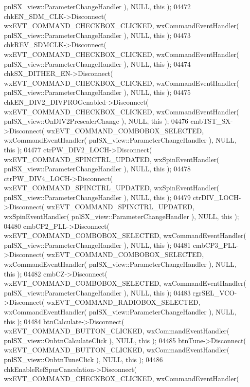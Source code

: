 \begin{DoxyCode}
      pnlSX_view::ParameterChangeHandler ), NULL, \textcolor{keyword}{this} );
04472     chkEN_SDM_CLK->Disconnect( wxEVT\_COMMAND\_CHECKBOX\_CLICKED, wxCommandEventHandler( 
      pnlSX_view::ParameterChangeHandler ), NULL, \textcolor{keyword}{this} );
04473     chkREV_SDMCLK->Disconnect( wxEVT\_COMMAND\_CHECKBOX\_CLICKED, wxCommandEventHandler( 
      pnlSX_view::ParameterChangeHandler ), NULL, \textcolor{keyword}{this} );
04474     chkSX_DITHER_EN->Disconnect( wxEVT\_COMMAND\_CHECKBOX\_CLICKED, wxCommandEventHandler( 
      pnlSX_view::ParameterChangeHandler ), NULL, \textcolor{keyword}{this} );
04475     chkEN_DIV2_DIVPROGenabled->Disconnect( wxEVT\_COMMAND\_CHECKBOX\_CLICKED, wxCommandEventHandler( 
      pnlSX_view::OnDIV2PrescalerChange ), NULL, \textcolor{keyword}{this} );
04476     cmbTST_SX->Disconnect( wxEVT\_COMMAND\_COMBOBOX\_SELECTED, wxCommandEventHandler( 
      pnlSX_view::ParameterChangeHandler ), NULL, \textcolor{keyword}{this} );
04477     ctrPW_DIV2_LOCH->Disconnect( wxEVT\_COMMAND\_SPINCTRL\_UPDATED, wxSpinEventHandler( 
      pnlSX_view::ParameterChangeHandler ), NULL, \textcolor{keyword}{this} );
04478     ctrPW_DIV4_LOCH->Disconnect( wxEVT\_COMMAND\_SPINCTRL\_UPDATED, wxSpinEventHandler( 
      pnlSX_view::ParameterChangeHandler ), NULL, \textcolor{keyword}{this} );
04479     ctrDIV_LOCH->Disconnect( wxEVT\_COMMAND\_SPINCTRL\_UPDATED, wxSpinEventHandler( 
      pnlSX_view::ParameterChangeHandler ), NULL, \textcolor{keyword}{this} );
04480     cmbCP2_PLL->Disconnect( wxEVT\_COMMAND\_COMBOBOX\_SELECTED, wxCommandEventHandler( 
      pnlSX_view::ParameterChangeHandler ), NULL, \textcolor{keyword}{this} );
04481     cmbCP3_PLL->Disconnect( wxEVT\_COMMAND\_COMBOBOX\_SELECTED, wxCommandEventHandler( 
      pnlSX_view::ParameterChangeHandler ), NULL, \textcolor{keyword}{this} );
04482     cmbCZ->Disconnect( wxEVT\_COMMAND\_COMBOBOX\_SELECTED, wxCommandEventHandler( 
      pnlSX_view::ParameterChangeHandler ), NULL, \textcolor{keyword}{this} );
04483     rgrSEL_VCO->Disconnect( wxEVT\_COMMAND\_RADIOBOX\_SELECTED, wxCommandEventHandler( 
      pnlSX_view::ParameterChangeHandler ), NULL, \textcolor{keyword}{this} );
04484     btnCalculate->Disconnect( wxEVT\_COMMAND\_BUTTON\_CLICKED, wxCommandEventHandler( 
      pnlSX_view::OnbtnCalculateClick ), NULL, \textcolor{keyword}{this} );
04485     btnTune->Disconnect( wxEVT\_COMMAND\_BUTTON\_CLICKED, wxCommandEventHandler( 
      pnlSX_view::OnbtnTuneClick ), NULL, \textcolor{keyword}{this} );
04486     chkEnableRefSpurCancelation->Disconnect( wxEVT\_COMMAND\_CHECKBOX\_CLICKED, wxCommandEventHandler( 

\end{DoxyCode}
